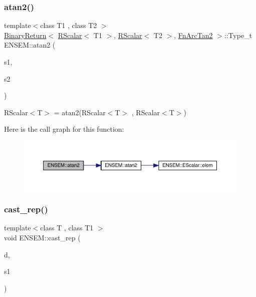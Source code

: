 \subsubsection{\texorpdfstring{atan2()}{atan2()}}
{\footnotesize\ttfamily template$<$class T1 , class T2 $>$ \\
\mbox{\hyperlink{structENSEM_1_1BinaryReturn}{Binary\+Return}}$<$ \mbox{\hyperlink{classENSEM_1_1RScalar}{R\+Scalar}}$<$ T1 $>$, \mbox{\hyperlink{classENSEM_1_1RScalar}{R\+Scalar}}$<$ T2 $>$, \mbox{\hyperlink{structENSEM_1_1FnArcTan2}{Fn\+Arc\+Tan2}} $>$\+::Type\+\_\+t E\+N\+S\+E\+M\+::atan2 (\begin{DoxyParamCaption}\item[{const \mbox{\hyperlink{classENSEM_1_1RScalar}{R\+Scalar}}$<$ T1 $>$ \&}]{s1,  }\item[{const \mbox{\hyperlink{classENSEM_1_1RScalar}{R\+Scalar}}$<$ T2 $>$ \&}]{s2 }\end{DoxyParamCaption})\hspace{0.3cm}{\ttfamily [inline]}}



R\+Scalar$<$\+T$>$ = atan2(\+R\+Scalar$<$\+T$>$ , R\+Scalar$<$\+T$>$) 

Here is the call graph for this function\+:\nopagebreak
\begin{figure}[H]
\begin{center}
\leavevmode
\includegraphics[width=350pt]{d9/ded/group__rscalar_ga855c0e6f402b471f9ddfc04245e0b910_cgraph}
\end{center}
\end{figure}
\mbox{\label{group__rscalar_ga7fc2c1b07bacdd72df1204c120ace7a0}} 
\subsubsection{\texorpdfstring{cast\_rep()}{cast\_rep()}}
{\footnotesize\ttfamily template$<$class T , class T1 $>$ \\
void E\+N\+S\+E\+M\+::cast\+\_\+rep (\begin{DoxyParamCaption}\item[{T \&}]{d,  }\item[{const \mbox{\hyperlink{classENSEM_1_1RScalar}{R\+Scalar}}$<$ T1 $>$ \&}]{s1 }\end{DoxyParamCaption})\hspace{0.3cm}{\ttfamily [inline]}}



